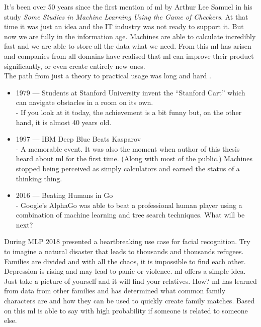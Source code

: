 \documentclass[thesis=M,english]{FITthesis}[2012/06/26]
\begin{document}
It's been over 50 years since the first mention of \acrshort{ml} by Arthur Lee Samuel in his study \textit{Some Studies in Machine Learning Using the Game of Checkers}\cite{ml_first_occurence}. At that time it was just an idea and the IT industry was not ready to support it. But now we are fully in the information age. Machines are able to calculate incredibly fast and we are able to store all the data what we need. From this \acrshort{ml} has arisen and companies from all domains have realised that \acrshort{ml} can improve their product significantly, or even create entirely new ones.\\

The path from just a theory to practical usage was long and hard \cite{ml_history}.\\

\begin{itemize}[nosep]
	\item 1979 — Students at Stanford University invent the “Stanford Cart” which can navigate obstacles in a room on its own.\\
	- If you look at it today, the achievement is a bit funny but, on the other hand, it is almost 40 years old.
	\item 1997 — IBM Deep Blue Beats Kasparov\\
	- A memorable event. It was also the moment when author of this thesis heard about \acrshort{ml} for the first time. (Along with most of the public.) Machines stopped being perceived as simply calculators and earned the status of a thinking thing.
	\item 2016 — Beating Humans in Go\\
	 - Google's AlphaGo was able to beat a professional human player using a combination of machine learning and tree search techniques. What will be next? 
\end{itemize}

\pagebreak
During MLP 2018 \cite{mlp2018_microsoft} presented a heartbreaking use case for facial recognition. Try to imagine a natural disaster that leads to thousands and thousands refugees. Families are divided and with all the chaos, it is impossible to find each other. Depression is rising and may lead to panic or violence. \acrshort{ml} offers a simple idea. Just take a picture of yourself and it will find your relatives. How? \acrshort{ml} has learned from data from other families and has determined what common family characters are and how they can be used to quickly create family matches. Based on this \acrshort{ml} is able to say with high probability if someone is related to someone else. \\
\end{document}
